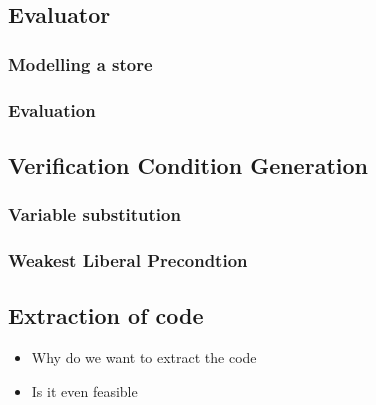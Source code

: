 \subsection{Evaluator}


\subsubsection{Modelling a store}


\subsubsection{Evaluation}


\subsection{Verification Condition Generation}


\subsubsection{Variable substitution}


\subsubsection{Weakest Liberal Precondtion}


\subsection{Extraction of code}


\begin{itemize}
\item Why do we want to extract the code
  \item Is it even feasible
\end{itemize}